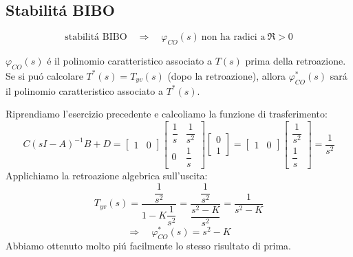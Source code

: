 \documentclass[../main.tex]{subfiles}
\begin{document}
	\subsection{Stabilit\'a BIBO}
		\[
			\text{stabilit\'a BIBO}\quad\Rightarrow\quad \varphi_{CO}(s)\ \text{non ha radici a}\ \Re > 0
		\]
		
		$ \varphi_{CO}(s) $ \'e il polinomio caratteristico associato a $ T(s) $ prima della retroazione. Se si pu\'o calcolare $ T^{*}(s) = T_{yv}(s) $ (dopo la retroazione), allora $ \varphi^{*}_{CO}(s) $ sar\'a il polinomio caratteristico associato a $ T^{*}(s) $.
		
		\begin{mdframed}[style=Exercise]
			\begin{Exercise}[title={Studio retr. alg. sull'uscita con l'algebra dei blocchi}]
				Riprendiamo l'esercizio precedente e calcoliamo la funzione di trasferimento:
				\[
					C(sI-A)^{-1}B +D =
					\begin{bmatrix}
						1 & 0
					\end{bmatrix}
					\begin{bmatrix}
						\dfrac{1}{s} & \dfrac{1}{s^2}
						\\[1em]
						0 & \dfrac{1}{s}
					\end{bmatrix}
					\begin{bmatrix}
						0\\
						1
					\end{bmatrix} =
					\begin{bmatrix}
						1 & 0
					\end{bmatrix}
					\begin{bmatrix}
						\dfrac{1}{s^2}
						\\[1em]
						\dfrac{1}{s}
					\end{bmatrix} =
					\dfrac{1}{s^2}
				\]
				Applichiamo la retroazione algebrica sull'uscita:
				\[
					T_{yv}(s) = \dfrac{\dfrac{1}{s^2}}{1-K\dfrac{1}{s^2}} = \dfrac{\dfrac{1}{s^2}}{\dfrac{s^2-K}{s^2}} = \dfrac{1}{s^2 - K}
				\]
				\[
					\Rightarrow\quad \varphi^{*}_{CO}(s) = s^2 -K
				\]
				Abbiamo ottenuto molto pi\'u facilmente lo stesso risultato di prima.
			\end{Exercise}
		\end{mdframed}
\end{document}

